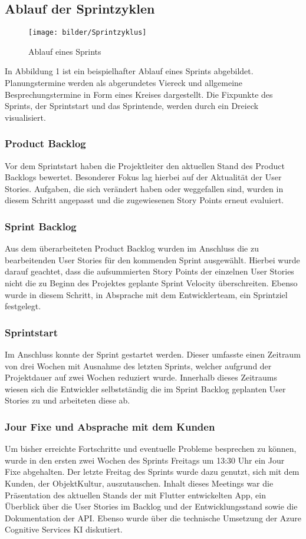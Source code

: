 \subsection{Ablauf der Sprintzyklen}

\begin{figure}[H]
  \centering
    \texttt{[image: bilder/Sprintzyklus]}
    \caption{Ablauf eines Sprints}
\end{figure}

In Abbildung 1 ist ein beispielhafter Ablauf eines Sprints abgebildet. Planungstermine werden als abgerundetes Viereck und allgemeine Besprechungstermine in Form eines Kreises dargestellt. Die Fixpunkte des Sprints, der Sprintstart und das Sprintende, werden durch ein Dreieck visualisiert.

\subsubsection{Product Backlog}
Vor dem Sprintstart haben die Projektleiter den aktuellen Stand des Product Backlogs bewertet. Besonderer Fokus lag hierbei auf der Aktualität der User Stories. Aufgaben, die sich verändert haben oder weggefallen sind, wurden in diesem Schritt angepasst und die zugewiesenen Story Points erneut evaluiert. 
\subsubsection{Sprint Backlog}
Aus dem überarbeiteten Product Backlog wurden im Anschluss die zu bearbeitenden User Stories für den kommenden Sprint ausgewählt. Hierbei wurde darauf geachtet, dass die aufsummierten Story Points der einzelnen User Stories nicht die zu Beginn des Projektes geplante Sprint Velocity überschreiten. Ebenso wurde in diesem Schritt, in Absprache mit dem Entwicklerteam, ein Sprintziel festgelegt. 
\subsubsection{Sprintstart}
Im Anschluss konnte der Sprint gestartet werden. Dieser umfasste einen Zeitraum von drei Wochen mit Ausnahme des letzten Sprints, welcher aufgrund der Projektdauer auf zwei Wochen reduziert wurde. Innerhalb dieses Zeitraums wiesen sich die Entwickler selbstständig die im Sprint Backlog geplanten User Stories zu und arbeiteten diese ab. 
\subsubsection{Jour Fixe und Absprache mit dem Kunden}
Um bisher erreichte Fortschritte und eventuelle Probleme besprechen zu können, wurde in den ersten zwei Wochen des Sprints Freitags um 13:30 Uhr ein Jour Fixe abgehalten. Der letzte Freitag des Sprints wurde dazu genutzt, sich mit dem Kunden, der ObjektKultur, auszutauschen. Inhalt dieses Meetings war die Präsentation des aktuellen Stands der mit Flutter entwickelten App, ein Überblick über die User Stories im Backlog und der Entwicklungsstand sowie die Dokumentation der API. Ebenso wurde über die technische Umsetzung der Azure Cognitive Services KI diskutiert. 
